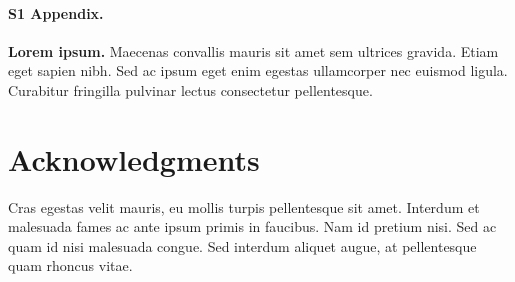 \documentclass[10pt,letterpaper]{article}
\begin{document}
\paragraph*{S1 Appendix.}
\label{S1_Appendix}
{\bf Lorem ipsum.} Maecenas convallis mauris sit amet sem ultrices gravida. Etiam eget sapien nibh. Sed ac ipsum eget enim egestas ullamcorper nec euismod ligula. Curabitur fringilla pulvinar lectus consectetur pellentesque.

\section*{Acknowledgments}
Cras egestas velit mauris, eu mollis turpis pellentesque sit amet. Interdum et malesuada fames ac ante ipsum primis in faucibus. Nam id pretium nisi. Sed ac quam id nisi malesuada congue. Sed interdum aliquet augue, at pellentesque quam rhoncus vitae.

\nolinenumbers

%
%
% 

\end{document}
